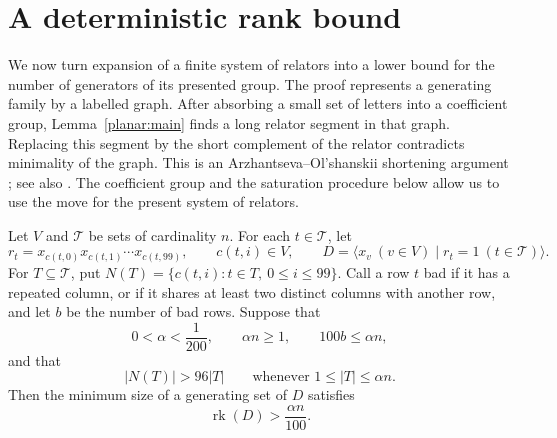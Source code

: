 \section{A deterministic rank bound}\label{rank:section}

We now turn expansion of a finite system of relators into a lower bound
for the number of generators of its presented group.  The proof represents
a generating family by a labelled graph.  After absorbing a small set of
letters into a coefficient group, Lemma~\ref{planar:main} finds a long
relator segment in that graph.  Replacing this segment by the short
complement of the relator contradicts minimality of the graph.
This is an Arzhantseva--Ol'shanskii shortening argument
\cite[\S~Marked graphs]{arzhantseva-olshanskii-1996}; see also
\cite[Definitions~2.6--2.9 and Proposition~2.11]{kapovich-schupp-2002}.
The coefficient group and the saturation procedure below allow us to
use the move for the present system of relators.

\begin{theorem}\label{rank:main}
Let $V$ and $\mathcal T$ be sets of cardinality $n$.  For each
$t\in\mathcal T$, let
\[
 r_t=x_{c(t,0)}x_{c(t,1)}\cdots x_{c(t,99)},\qquad c(t,i)\in V,
 \qquad
 D=\langle x_v\ (v\in V)\mid r_t=1\ (t\in\mathcal T)\rangle.
\]
For $T\subseteq\mathcal T$, put
$N(T)=\{c(t,i):t\in T,\ 0\le i\le99\}$.
Call a row $t$ bad if it has a repeated column, or if it shares at least
two distinct columns with another row, and let $b$ be the number of bad
rows.  Suppose that
\[
 0<\alpha<\frac1{200},\qquad \alpha n\ge1,
 \qquad 100b\le\alpha n,
\]
and that
\begin{equation}\label{rank:expansion}
 |N(T)|>96|T|\qquad
 \text{whenever }1\le |T|\le\alpha n.
\end{equation}
Then the minimum size of a generating set of $D$ satisfies
\[
 \operatorname{rk}(D)>\frac{\alpha n}{100}.
\]
\end{theorem}

